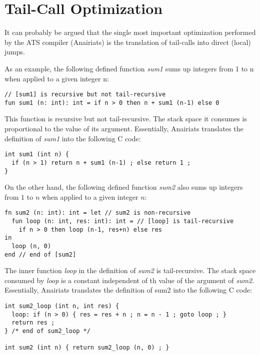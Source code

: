 
\section{Tail-Call Optimization}

It can probably be argued that the single most important optimization
performed by the ATS compiler (Anairiats) is the translation of tail-calls
into direct (local) jumps.

As an example, the following defined function {\it sum1} sums up integers
from 1 to n when applied to a given integer n:
\begin{verbatim}
// [sum1] is recursive but not tail-recursive
fun sum1 (n: int): int = if n > 0 then n + sum1 (n-1) else 0
\end{verbatim}
This function is recursive but not tail-recursive. The stack space it
consumes is proportional to the value of its argument. Essentially,
Anairiats translates the definition of {\it sum1} into the following C
code:
\begin{verbatim}
int sum1 (int n) {
  if (n > 1) return n + sum1 (n-1) ; else return 1 ;
}
\end{verbatim}
On the other hand, the following defined function {\it sum2} also sums up
integers from $1$ to $n$ when applied to a given integer $n$:
\begin{verbatim}
fn sum2 (n: int): int = let // sum2 is non-recursive
  fun loop (n: int, res: int): int = // [loop] is tail-recursive
    if n > 0 then loop (n-1, res+n) else res
in
  loop (n, 0)
end // end of [sum2]
\end{verbatim}
The inner function {\it loop} in the definition of {\it sum2} is
tail-recursive. The stack space consumed by {\it loop} is a constant
independent of th value of the argument of {\it sum2}. Essentially,
Anairiats translates the definition of sum2 into the following C code:
\begin{verbatim}
int sum2_loop (int n, int res) {
  loop: if (n > 0) { res = res + n ; n = n - 1 ; goto loop ; }
  return res ;
} /* end of sum2_loop */

int sum2 (int n) { return sum2_loop (n, 0) ; }
\end{verbatim}

